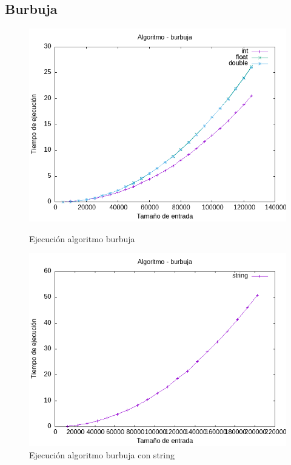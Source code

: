 \documentclass[11pt]{article}
\begin{document}
\subsection{Burbuja}
\begin{figure}[H]
    \begin{minipage}{0.5\textwidth}
        \centering
        \includegraphics[width=\linewidth]{assets/Img/burbuja.png}
        \caption{Ejecución algoritmo burbuja}
        \label{fig:burbuja}
    \end{minipage}%
    \begin{minipage}{0.5\textwidth}
        \centering
        \includegraphics[width=\linewidth]{assets/Img/burbujastring.png}
        \caption{Ejecución algoritmo burbuja con string}
        \label{fig:burbujastring}
    \end{minipage}
\end{figure}
\end{document}
